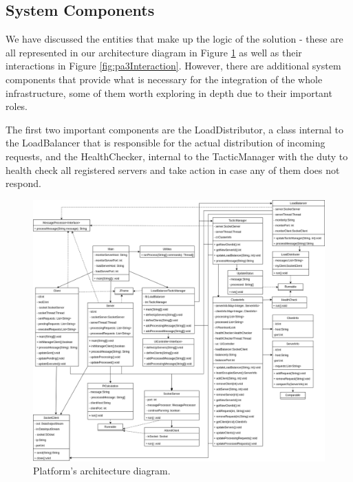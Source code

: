 \documentclass[12pt]{article}
\begin{document}
\subsection{System Components} %

We have discussed the entities that make up the logic of the solution - these are all represented in our architecture diagram in Figure \ref{fig:pa3Arch} as well
as their interactions in Figure \ref{fig:pa3Interaction}.
However, there are additional system components that provide what is necessary for the integration of the whole infrastructure, some of them worth exploring in
depth due to their important roles.

The first two important components are the LoadDistributor, a class internal to the LoadBalancer that is responsible for the actual distribution of incoming requests,
and the HealthChecker, internal to the TacticManager with the duty to health check all registered servers and take action in case any of them does not respond.

\begin{figure}[H]
  \centering
  \begin{minipage}{\textwidth}
    \centering
    \includegraphics[width=\linewidth]{img/pa3Arch.png}
  \end{minipage}%
  \caption{Platform's architecture diagram.}
  \label{fig:pa3Arch}
\end{figure}
\end{document}
